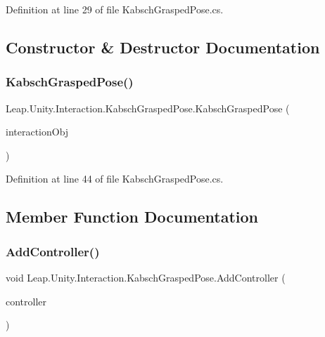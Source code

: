 Definition at line 29 of file Kabsch\+Grasped\+Pose.\+cs.



\subsection{Constructor \& Destructor Documentation}
\mbox{\label{class_leap_1_1_unity_1_1_interaction_1_1_kabsch_grasped_pose_aa01fe24ea822fcb0e2a99511dd617ab6}} 
\subsubsection{\texorpdfstring{KabschGraspedPose()}{KabschGraspedPose()}}
{\footnotesize\ttfamily Leap.\+Unity.\+Interaction.\+Kabsch\+Grasped\+Pose.\+Kabsch\+Grasped\+Pose (\begin{DoxyParamCaption}\item[{\mbox{\hyperlink{class_leap_1_1_unity_1_1_interaction_1_1_interaction_behaviour}{Interaction\+Behaviour}}}]{interaction\+Obj }\end{DoxyParamCaption})}



Definition at line 44 of file Kabsch\+Grasped\+Pose.\+cs.



\subsection{Member Function Documentation}
\mbox{\label{class_leap_1_1_unity_1_1_interaction_1_1_kabsch_grasped_pose_a48e190a6d9cadcaf3340d339ac61d464}} 
\subsubsection{\texorpdfstring{AddController()}{AddController()}}
{\footnotesize\ttfamily void Leap.\+Unity.\+Interaction.\+Kabsch\+Grasped\+Pose.\+Add\+Controller (\begin{DoxyParamCaption}\item[{\mbox{\hyperlink{class_leap_1_1_unity_1_1_interaction_1_1_interaction_controller}{Interaction\+Controller}}}]{controller }\end{DoxyParamCaption})}



